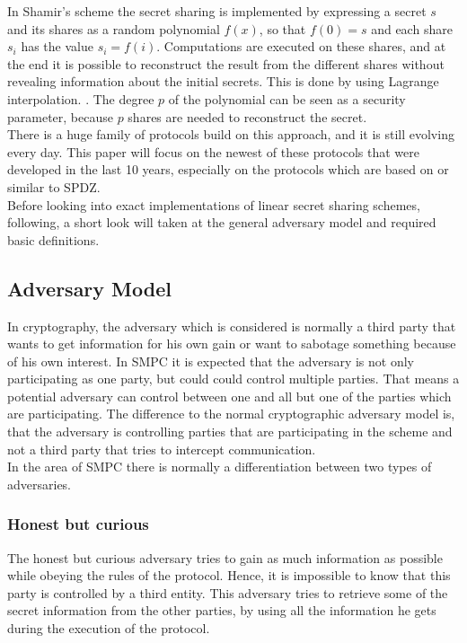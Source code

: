 \documentclass[english,runningheads,a4paper]{llncs}[2018/03/10]
\begin{document}
In Shamir's scheme the secret sharing is implemented by expressing a secret $s$ and its shares as a random polynomial $f(x)$, so that $f(0)=s$ and each share $s_i$ has the value $s_i=f(i)$. Computations are executed on these shares, and at the end it is possible to reconstruct the result from the different shares without revealing information about the initial secrets. This is done by using Lagrange interpolation. . The degree $p$ of the polynomial can be seen as a security parameter, because $p$ shares are needed to reconstruct the secret.\\
There is a huge family of protocols build on this approach, and it is still evolving every day. This paper will focus on the newest of these protocols that were developed in the last 10 years, especially on the protocols which are based on or similar to SPDZ. \\
Before looking into exact implementations of linear secret sharing schemes, following, a short look will taken at the general adversary model and required basic definitions.
\subsection{Adversary Model}
In cryptography, the adversary which is considered is normally a third party that wants to get information for his own gain or want to sabotage something because of his own interest. In SMPC it is expected that the adversary is not only participating as one party, but could could control multiple parties. That means a potential adversary can control between one and all but one of the parties which are participating. The difference to the normal cryptographic adversary model is, that the adversary is controlling parties that are participating in the scheme and not a third party that tries to intercept communication.\\
In the area of SMPC there is normally a differentiation between two types of adversaries.
\subsubsection{Honest but curious}
The honest but curious adversary tries to gain as much information as possible while obeying the rules of the protocol. Hence, it is impossible to know that this party is controlled by a third entity. This adversary tries to retrieve some of the secret information from the other parties, by using all the information he gets during the execution of the protocol.
\end{document}
